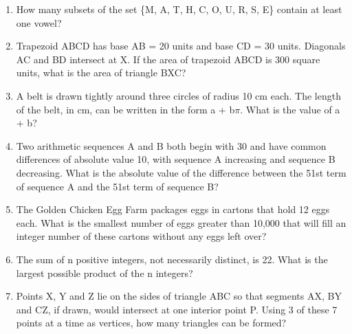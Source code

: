 \documentclass[12pt]{article}
\begin{document}
\begin{enumerate}
\item How many subsets of the set \{M, A, T, H, C, O, U, R, S, E\}
contain at least one vowel?
\vspace{1cm}

\item Trapezoid ABCD has base AB = 20 units and base
CD = 30 units. Diagonals AC and BD intersect at X. If the
area of trapezoid ABCD is 300 square units, what is the area of
triangle BXC?
\vspace{1cm}
\item A belt is drawn tightly around three circles of radius 10 cm
each. The length of the belt, in cm, can be written in
the form a + b$\pi$. What is the value of a + b?

\vspace{1cm}
\item Two arithmetic sequences A and B both begin with 30 and
have common differences of absolute value 10, with sequence
A increasing and sequence B decreasing. What is the absolute
value of the difference between the 51st term of sequence A
and the 51st term of sequence B?
\vspace{1cm}
\item The Golden Chicken Egg Farm packages eggs
in cartons that hold 12 eggs each. What is the
smallest number of eggs greater than
10,000 that will fill an integer number of these
cartons without any eggs left over?
\vspace{1cm}


\item The sum of n positive integers, not necessarily distinct, is 22. What
is the largest possible product of the n integers?

\vspace{1cm}
\item Points X, Y and Z lie on the sides of triangle ABC so that segments
AX, BY and CZ, if drawn, would intersect at one interior point P.
Using 3 of these 7 points at a time as vertices, how many triangles
can be formed?


\end{enumerate}
\end{document}
